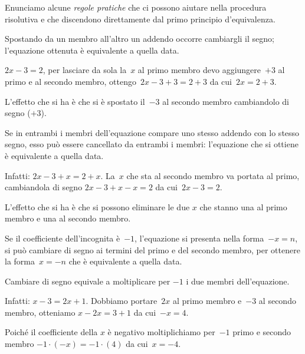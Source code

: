 Enunciamo alcune \emph{regole pratiche} che ci possono aiutare nella
procedura risolutiva e che discendono direttamente dal primo principio
d'equivalenza.
\begin{enumeratea}
\item Spostando da un membro all'altro un addendo occorre cambiargli il segno; l'equazione ottenuta è equivalente a quella data.

$2x-3=2$, per lasciare da sola la~$x$ al primo membro devo aggiungere~$+3$ al primo e
al secondo membro, ottengo~$2x-3+3=2+3$ da cui~$2x=2+3$.

L'effetto che si ha è che si è spostato il~$-3$ al
secondo membro cambiandolo di segno ($+3$).
\item Se in entrambi i membri dell'equazione compare uno
stesso addendo con lo stesso segno, esso può essere cancellato da
entrambi i membri: l'equazione che si ottiene è
equivalente a quella data.

Infatti:
$2x-3+x=2+x$. La~$x$ che sta al secondo membro va portata al primo, cambiandola di segno
$2x-3+x-x=2$ da cui~$2x-3=2$.

L'effetto che si ha è che si possono eliminare le due
$x$ che stanno una al primo membro e una al secondo membro.
\item Se il coefficiente dell'incognita è~$-1$, %
l'equazione si presenta nella forma~$-x=n$, si
può cambiare di segno ai termini del primo e del secondo membro, per
ottenere la forma~$x=-n$ che è equivalente a quella data.

Cambiare di segno equivale a moltiplicare per
$-1$ i due membri dell'equazione.

Infatti:
$x-3=2x+1$. Dobbiamo portare~$2x$ al primo membro e~$-3$ al secondo membro, otteniamo
$x-2x=3+1$ da cui~$-x=4$.

Poiché il coefficiente della $x$ è negativo moltiplichiamo per~$-1$
primo e secondo membro
$-1\cdot (-x)=-1\cdot (4)$ da cui~$x=-4$.
\end{enumeratea}

